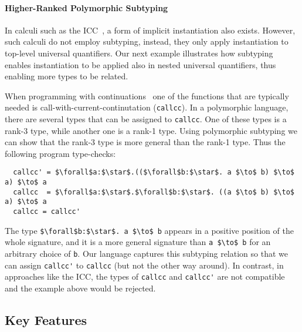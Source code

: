 \paragraph{Higher-Ranked Polymorphic Subtyping}
\label{sec:higher-ranked-poly}

In calculi such as the ICC~\cite{miquel2001implicit}, a form of implicit instantiation also exists.
However, such calculi do not employ subtyping, instead, they only apply instantiation
to top-level universal quantifiers. Our next example illustrates how subtyping enables
instantiation to be applied also in nested universal quantifiers, thus enabling
more types to be related.

When programming with continuations~\cite{sussman1998scheme} one of the
functions that are typically needed is call-with-current-continutation
(\verb|callcc|). In a polymorphic language, there are several types that can be
assigned to \verb|callcc|. One of these types is a rank-3 type,
while another one is a rank-1 type.
Using polymorphic subtyping we can show that the rank-3
type is more general than the rank-1 type. Thus the following program type-checks:
\begin{lstlisting}
  callcc' = $\forall$a:$\star$.(($\forall$b:$\star$. a $\to$ b) $\to$ a) $\to$ a
  callcc  = $\forall$a:$\star$.$\forall$b:$\star$. ((a $\to$ b) $\to$ a) $\to$ a
  callcc = callcc'
\end{lstlisting}
\noindent The type \lstinline{$\forall$b:$\star$. a $\to$ b} appears in a positive position
of the whole signature, and it is a more general signature than \lstinline{a $\to$ b}
for an arbitrary choice of \lstinline{b}. Our language captures this subtyping relation so that
we can assign \lstinline{callcc'} to \lstinline{callcc} (but not the other way around).
In contrast, in approaches like the ICC, the types of \lstinline{callcc} and \lstinline{callcc'}
are not compatible and the example above would be rejected.

\subsection{Key Features}
\label{sec:feature-overview}

